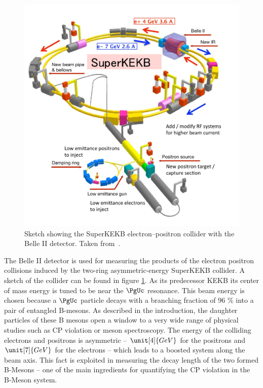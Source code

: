 \begin{figure}
 \centering
 \includegraphics[height=0.4\textheight]{figures/experimental_setup/superkekb.jpg}
 \caption[Sketch showing the SuperKEKB electron--positron collider.]{Sketch showing the SuperKEKB electron--positron collider with the Belle II detector. Taken from~\cite{DesyWebseite}.}
 \label{fig-superkekb}
\end{figure}


The Belle II detector is used for measuring the products of the electron positron collisions induced by the two-ring asymmetric-energy SuperKEKB collider. A sketch of the collider can be found in figure \ref{fig-superkekb}. As its predecessor KEKB its center of mass energy is tuned to be near the $\PgUc$ resonance. This beam energy is chosen because a $\PgUc$ particle decays with a branching fraction of 96 \% into a pair of entangled B-mesons. As described in the introduction, the daughter particles of these B mesons open a window to a very wide range of physical studies such as CP violation or meson spectroscopy. The energy of the colliding electrons and positrons is asymmetric -- $\unit[4]{GeV}$ for the positrons and $\unit[7]{GeV}$ for the electrons -- which leads to a boosted system along the beam axis. This fact is exploited in measuring the decay length of the two formed B-Mesons -- one of the main ingredients for quantifying the CP violation in the B-Meson system. 


